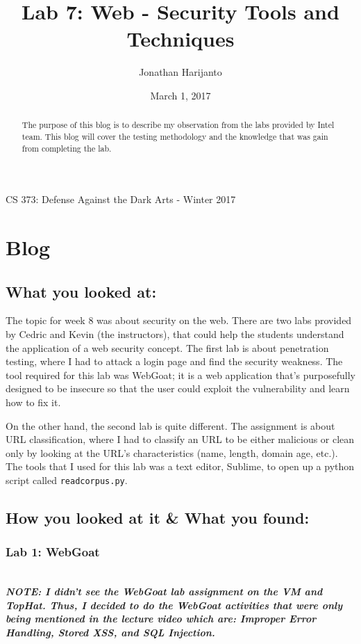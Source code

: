\documentclass[letterpaper,10pt,titlepage,draftclsnofoot,onecolumn]{IEEEtran}
\title{Lab 7: Web - Security Tools and Techniques}
\author{Jonathan Harijanto}
\date{March 1, 2017}
\begin{document}
\maketitle
\begin{center}
CS 373: Defense Against the Dark Arts - Winter 2017
\vfill
\end{center}

\begin{abstract}

The purpose of this blog is to describe my observation from the labs provided by Intel team.
This blog will cover the testing methodology and the knowledge that was gain from completing the lab.

\end{abstract}
\newpage

\section{Blog} 

\subsection{What you looked at:}
The topic for week 8 was about security on the web. 
There are two labs provided by Cedric and Kevin (the instructors), that could help the students understand the application of a web security concept.
The first lab is about penetration testing, where I had to attack a login page and find the security weakness. 
The tool required for this lab was WebGoat; it is a web application that's purposefully designed to be insecure so that the user could exploit the vulnerability and learn how to fix it.

On the other hand, the second lab is quite different. 
The assignment is about URL classification, where I had to classify an URL to be either malicious or clean only by looking at the URL's characteristics (name, length, domain age, etc.). 
The tools that I used for this lab was a text editor, Sublime, to open up a python script called \verb|readcorpus.py|. 


\subsection{How you looked at it \& What you found:}
\subsubsection{Lab 1: WebGoat}
\hfill\\	
\textbf{\emph{NOTE: I didn't see the WebGoat lab assignment on the VM and TopHat. Thus, I decided to do the WebGoat activities that were only being mentioned in the lecture video which are: Improper Error Handling, Stored XSS, and SQL Injection.}}
\end{document}
